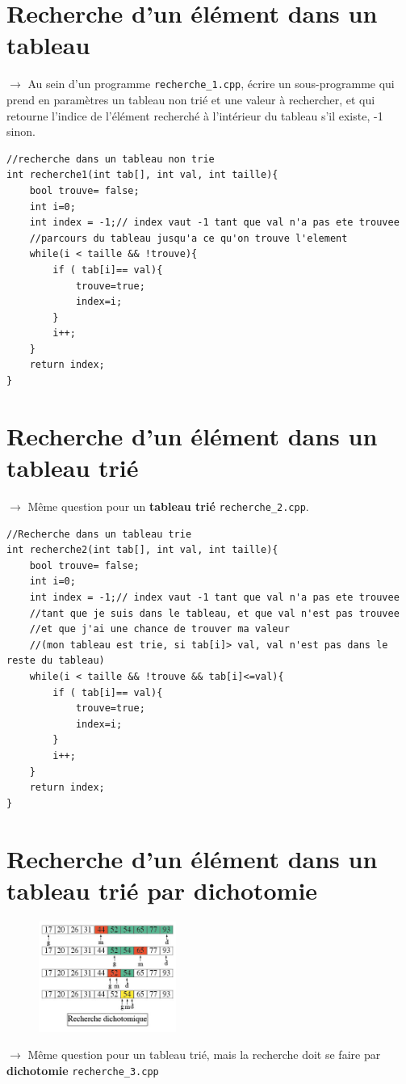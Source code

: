 \documentclass[french]{article}
\begin{document}
\section{Recherche d'un élément dans un tableau}

	$\rightarrow$ Au sein d’un programme \texttt{recherche\_1.cpp}, écrire un sous-programme qui prend en paramètres un tableau non trié et une valeur à rechercher, et qui retourne l’indice de l’élément recherché à l’intérieur du tableau s’il existe, -1 sinon.
	
	\begin{lstlisting}[caption={Recherche dans un tableau non trie}]
//recherche dans un tableau non trie
int recherche1(int tab[], int val, int taille){
    bool trouve= false;
    int i=0;
    int index = -1;// index vaut -1 tant que val n'a pas ete trouvee
    //parcours du tableau jusqu'a ce qu'on trouve l'element
    while(i < taille && !trouve){
        if ( tab[i]== val){
            trouve=true;
            index=i;
        }
        i++;
    }
    return index;
}
	\end{lstlisting}
	
\section{Recherche d'un élément dans un tableau trié}
	$\rightarrow$ Même question pour un \textbf{tableau trié} \texttt{recherche\_2.cpp}.

\begin{lstlisting}[caption={Recherche dans un tableau trie}]
//Recherche dans un tableau trie
int recherche2(int tab[], int val, int taille){
    bool trouve= false;
    int i=0;
    int index = -1;// index vaut -1 tant que val n'a pas ete trouvee
    //tant que je suis dans le tableau, et que val n'est pas trouvee
    //et que j'ai une chance de trouver ma valeur
    //(mon tableau est trie, si tab[i]> val, val n'est pas dans le reste du tableau)
    while(i < taille && !trouve && tab[i]<=val){
        if ( tab[i]== val){
            trouve=true;
            index=i;
        }
        i++;
    }
    return index;
}
\end{lstlisting}

\section{Recherche d'un élément dans un tableau trié par dichotomie}
	
	\begin{figure}[h]
		\centering
		\includegraphics[width=0.4\textwidth]{dicho.jpg}
	\end{figure}
	$\rightarrow$ Même question pour un tableau trié, mais la recherche doit se faire par \textbf{dichotomie} \texttt{recherche\_3.cpp}
	
\end{document}
